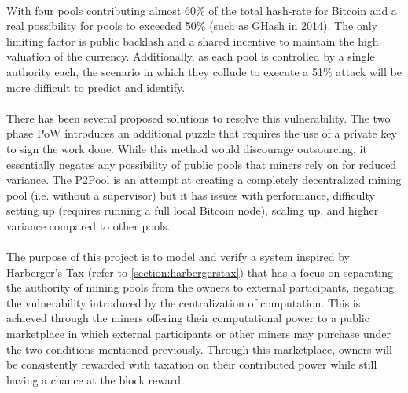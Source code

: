 \paragraph{} With four pools contributing almost 60\% of the total hash-rate for Bitcoin \cite{bitcoinpools2020} and a real possibility for pools to exceeded 50\% (such as GHash in 2014). The only limiting factor is public backlash and a shared incentive to maintain the high valuation of the currency. Additionally, as each pool is controlled by a single authority each, the scenario in which they collude to execute a 51\% attack will be more difficult to predict and identify.

\paragraph{} There has been several proposed solutions to resolve this vulnerability. The two phase PoW \cite{bastiaan2015} introduces an additional puzzle that requires the use of a private key to sign the work done. While this method would discourage outsourcing, it essentially negates any possibility of public pools that miners rely on for reduced variance. The P2Pool is an attempt at creating a completely decentralized mining pool (i.e. without a supervisor) but it has issues with performance, difficulty setting up (requires running a full local Bitcoin node), scaling up, and higher variance compared to other pools. 

\paragraph{} The purpose of this project is to model and verify a system inspired by Harberger's Tax (refer to \ref{section:harbergerstax}) that has a focus on separating the authority of mining pools from the owners to external participants, negating the vulnerability introduced by the centralization of computation. This is achieved through the miners offering their computational power to a public marketplace in which external participants or other miners may purchase under the two conditions mentioned previously. Through this marketplace, owners will be consistently rewarded with taxation on their contributed power while still having a chance at the block reward.


